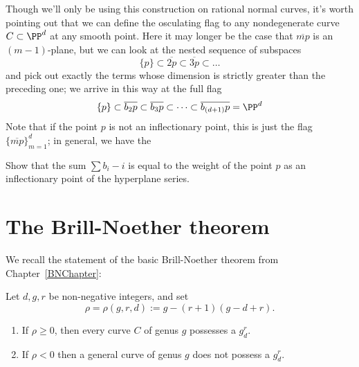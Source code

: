 Though we'll only be using this construction on rational normal curves, it's worth pointing out that we can define the osculating flag to any nondegenerate curve $C \subset \PP^d$ at any smooth point. Here it may longer be the case that $\overline{mp}$ is an $(m-1)$-plane, but we can look at the nested sequence of subspaces
$$
\{p\} \subset \overline{2p} \subset \overline{3p} \subset \dots 
$$
and pick out exactly the terms whose dimension is strictly greater than the preceding one; we arrive in this way at the full flag
$$
\{p\} \subset \overline{b_2p} \subset \overline{b_3p} \subset \dots \subset \overline{b_{(d+1)}p} = \PP^d
$$
Note that if the point $p$ is not an inflectionary point, this is just the flag $\{\overline{mp}\}_{m=1}^d$; in general, we have the 

\begin{exercise}
Show that the sum $\sum b_i - i$ is equal to the weight of the point $p$ as an inflectionary point of the hyperplane series.
\end{exercise}

\section{The Brill-Noether theorem}

We recall the statement of the basic Brill-Noether theorem from Chapter~\ref{BNChapter}:

\begin{theorem}\label{basic Brill Noether}
Let $d,g,r$ be non-negative integers, and set 
$$
\rho =\rho(g,r,d) := g - (r+1)(g-d+r).
$$
 \begin{enumerate}
\item If $\rho \geq 0$, then every curve $C$ of genus $g$ possesses a $g^r_d$.
\item If $\rho < 0$ then a general curve of genus $g$ does not possess a $g^r_d$.
\end{enumerate}
\end{theorem}


